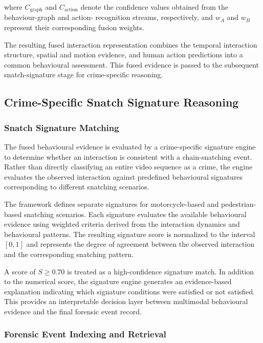 \documentclass[conference]{IEEEtran}
\begin{document}
where $C_{\mathrm{graph}}$ and $C_{\mathrm{action}}$ denote the
confidence values obtained from the behaviour-graph and action-
recognition streams, respectively, and $w_A$ and $w_B$ represent their
corresponding fusion weights.

The resulting fused interaction representation combines the temporal
interaction structure, spatial and motion evidence, and human action
predictions into a common behavioural assessment. This fused evidence is
passed to the subsequent snatch-signature stage for crime-specific
reasoning.

\subsection{Crime-Specific Snatch Signature Reasoning}

\subsubsection{Snatch Signature Matching}

The fused behavioural evidence is evaluated by a crime-specific signature
engine to determine whether an interaction is consistent with a
chain-snatching event. Rather than directly classifying an entire video
sequence as a crime, the engine evaluates the observed interaction
against predefined behavioural signatures corresponding to different
snatching scenarios.

The framework defines separate signatures for motorcycle-based and
pedestrian-based snatching scenarios. Each signature evaluates the
available behavioural evidence using weighted criteria derived from the
interaction dynamics and behavioural patterns. The resulting signature
score is normalized to the interval $[0,1]$ and represents the degree of
agreement between the observed interaction and the corresponding
snatching pattern.

A score of $S \geq 0.70$ is treated as a high-confidence signature
match. In addition to the numerical score, the signature engine
generates an evidence-based explanation indicating which signature
conditions were satisfied or not satisfied. This provides an
interpretable decision layer between multimodal behavioural evidence and
the final forensic event record.

\subsubsection{Forensic Event Indexing and Retrieval}
\end{document}
